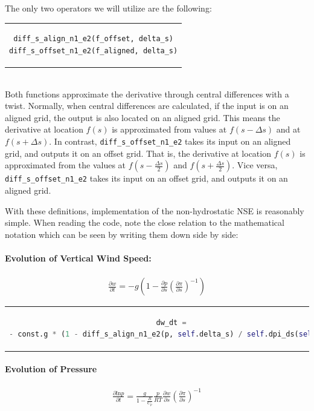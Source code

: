 \noindent
The only two operators we will utilize are the following:\\
\begin{tabular}{c}
\begin{lstlisting}[language=Python]
diff_s_align_n1_e2(f_offset, delta_s)
diff_s_offset_n1_e2(f_aligned, delta_s)
\end{lstlisting}
\end{tabular}\\
Both functions approximate the derivative through central differences with a twist.
Normally, when central differences are calculated, if the input is on an aligned grid, the output is also located on an aligned grid.
This means the derivative at location $f(s)$ is approximated from values at $f(s-\Delta s)$ and at $f(s+\Delta s)$.
In contrast, \texttt{diff\_s\_offset\_n1\_e2} takes its input on an aligned grid, and outputs it on an offset grid.
That is, the derivative at location $f(s)$ is approximated from the values at $f(s-\frac{\Delta s}{2})$ and $f(s+\frac{\Delta s}{2})$.
Vice versa, \texttt{diff\_s\_offset\_n1\_e2} takes its input on an offset grid, and outputs it on an aligned grid.

With these definitions, implementation of the non-hydrostatic NSE is reasonably simple.
When reading the code, note the close relation to the mathematical notation which can be seen by writing them down side by side:
\paragraph{Evolution of Vertical Wind Speed:}
\begin{align*}
\frac{\partial w}{\partial t} = -g\left(1 - \frac{\partial p}{\partial s}\left(\frac{\partial \pi}{\partial s}\right)^{-1}\right)
\end{align*}
\begin{center}
\begin{tabular}{c}
\begin{lstlisting}[language=Python]
dw_dt =
- const.g * (1 - diff_s_align_n1_e2(p, self.delta_s) / self.dpi_ds(self.s))
\end{lstlisting}
\end{tabular}
\end{center}

\paragraph{Evolution of Pressure}
\begin{align*}
\frac{\partial \text{ln}p}{\partial t} = \frac{g}{1- \frac{R}{C_p}} \frac{p}{RT} \frac{\partial w}{\partial s}\left(\frac{\partial \pi}{\partial s}\right)^{-1}
\end{align*}

